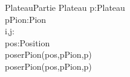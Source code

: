 \begin{algorithme}
  \small
  \fonction
  {PlateauPartie}
  {}
  {Plateau}
  {p:Plateau\\
  pPion:Pion\\
  i,j:\naturel\\
  pos:Position}
  { 
    {
      {
        {
          \\
          poserPion(pos,pPion,p)
        }
        {
          \\
          poserPion(pos,pPion,p)
        }
      }
    }
  }
\end{algorithme}